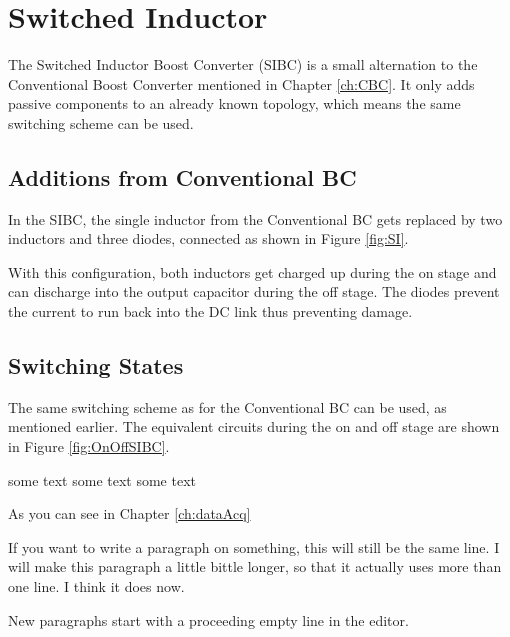 \chapter{Switched Inductor}\label{ch:SIBC}
The Switched Inductor Boost Converter (SIBC) is a small alternation to the Conventional Boost Converter mentioned in Chapter \ref{ch:CBC}.
It only adds passive components to an already known topology,
which means the same switching scheme can be used.
\section{Additions from Conventional BC}
In the SIBC,
the single inductor from the Conventional BC gets replaced by two inductors and three diodes,
connected as shown in Figure \ref{fig:SI}.

 \label{fig:SI}

With this configuration,
both inductors get charged up during the on stage
and can discharge into the output capacitor during the off stage.
The diodes prevent the current to run back into the DC link 
thus preventing damage.


\section{Switching States}
The same switching scheme as for the Conventional BC can be used,
as mentioned earlier.
The equivalent circuits during the on and off stage are shown in Figure \ref{fig:OnOffSIBC}.

\label{fig:OnOffSIBC}

some text
some text
some text

As you can see in Chapter \ref{ch:dataAcq}

If you want to write a paragraph on something,
this will still be the same line.
I will make this paragraph a little bittle longer,
so that it actually uses more than one line.
I think it does now.

New paragraphs start with a proceeding empty line in the editor.
